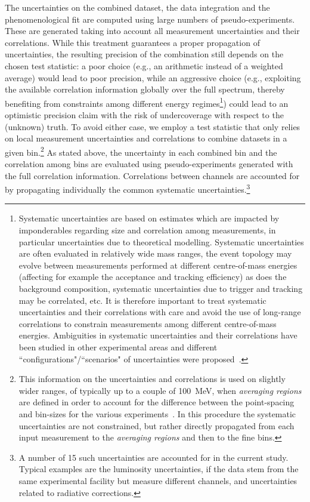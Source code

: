 The  uncertainties on the combined dataset, the data integration and the phenomenological fit are computed using large numbers of pseudo-experiments. 
These are generated taking into account all measurement uncertainties and their correlations. While this treatment guarantees a proper propagation of uncertainties, the resulting precision of the combination still depends on the chosen test statistic: a poor choice (e.g., an arithmetic instead of a weighted average) would lead to poor precision, while an aggressive choice (e.g., exploiting the available correlation information globally over the full spectrum, thereby benefiting from constraints among different energy regimes\footnote{Systematic uncertainties are based on estimates which are impacted by imponderables regarding size and correlation among measurements, in particular  uncertainties due to theoretical  modelling. Systematic uncertainties are often evaluated in relatively wide mass ranges, the event topology may evolve between measurements performed at different centre-of-mass energies (affecting for example the acceptance and tracking efficiency) as does the background composition, systematic uncertainties due to  trigger and tracking may be correlated, etc. It is therefore important to treat systematic uncertainties and their correlations with care and avoid the use of long-range correlations to constrain measurements among different centre-of-mass energies. Ambiguities in systematic uncertainties and their correlations have been studied in other experimental areas and  different ``configurations"/``scenarios" of uncertainties were proposed~\cite{Aad:2014bia, Aaboud:2017dvo, Aaboud:2017wsi}. }) could lead to an optimistic precision claim with the risk of undercoverage with respect to the (unknown) truth. 
To avoid either case, we employ a test statistic that only relies on local measurement uncertainties and correlations to combine datasets in a given bin.\footnote{This information on the uncertainties and correlations is used on slightly wider ranges, of typically up to a couple of 100~MeV, when {\it averaging regions} are defined in order to account for the difference between the point-spacing and bin-sizes for the various experiments~\cite{g209}. In this procedure the systematic uncertainties are not constrained, but rather directly propagated from each input measurement to the {\it averaging regions} and then to the fine bins.}
As stated above, the uncertainty in each combined bin and the correlation among bins are evaluated using pseudo-experiments generated with the full correlation information. Correlations between channels are accounted for by propagating individually the common systematic uncertainties.\footnote{A number of 15 such uncertainties are accounted for in the current study. Typical examples are the luminosity uncertainties, if the data stem from the same experimental facility but measure different channels, and uncertainties related to radiative corrections.} 



